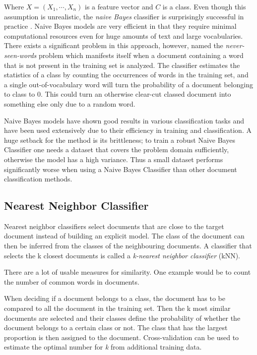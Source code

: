 Where $X = (X_{1},\cdots, X_{n})$ is a feature vector and $C$ is a class.
Even though this assumption is unrealistic, the \textit{naive Bayes} classifier is surprisingly successful in practice \cite{rish}.
Naive Bayes models are very efficient in that they require minimal computational resources even for huge amounts of text and large vocabularies.
There exists a significant problem in this approach, however, named the \textit{never-seen-words} problem which manifests itself when a document containing a word that is not present in the training set is analyzed. The classifier estimates the statistics of a class by counting the occurrences of words in the training set, and a single out-of-vocabulary word will turn the probability of a document belonging to class to 0. This could turn an otherwise clear-cut classed document into something else only due to a random word.
\cite{rigutini2004}

Naive Bayes models have shown good results in various classification tasks and have been used extensively due to their efficiency in training and classification.
A huge setback for the method is its brittleness; to train a robust Naive Bayes Classifier one needs a dataset that covers the problem domain sufficiently, otherwise the model has a high variance. Thus a small dataset performs significantly worse when using a Naive Bayes Classifier than other document classification methods.
\cite{rigutini2004} \cite{lewis1998}

\subsection{Nearest Neighbor Classifier} \label{Nearest Neighbor Classifier}
Nearest neighbor classifiers select documents that are close to the target document instead of building an explicit model. The class of the document can then be inferred from the classes of the neighbouring documents. A classifier that selects the k closest documents is called a \textit{k-nearest neighbor classifier} (kNN).
\cite{hotho}

There are a lot of usable measures for similarity. One example would be to count the number of common words in documents.

When deciding if a document belongs to a class, the document has to be compared to all the document in the training set. Then the k most similar documents are selected and their classes define the probability of whether the document belongs to a certain class or not. The class that has the largest proportion is then assigned to the document. Cross-validation can be used to estimate the optimal number for \textit{k} from additional training data.
\cite{hotho}

